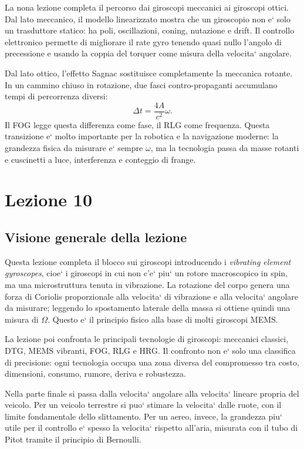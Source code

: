 \documentclass[11pt,a4paper]{article}
\begin{document}
La nona lezione completa il percorso dai giroscopi meccanici ai giroscopi ottici. Dal lato meccanico, il modello linearizzato mostra che un giroscopio non e` solo un trasduttore statico: ha poli, oscillazioni, coning, nutazione e drift. Il controllo elettronico permette di migliorare il rate gyro tenendo quasi nullo l'angolo di precessione e usando la coppia del torquer come misura della velocita` angolare.

Dal lato ottico, l'effetto Sagnac sostituisce completamente la meccanica rotante. In un cammino chiuso in rotazione, due fasci contro-propaganti accumulano tempi di percorrenza diversi:
\[
\Delta t=\frac{4A}{c^2}\omega.
\]
Il FOG legge questa differenza come fase, il RLG come frequenza. Questa transizione e` molto importante per la robotica e la navigazione moderne: la grandezza fisica da misurare e` sempre \(\omega\), ma la tecnologia passa da masse rotanti e cuscinetti a luce, interferenza e conteggio di frange.


\clearpage
\section{Lezione 10}

\subsection{Visione generale della lezione}

Questa lezione completa il blocco sui giroscopi introducendo i \emph{vibrating element gyroscopes}, cioe` i giroscopi in cui non c'e` piu` un rotore macroscopico in spin, ma una microstruttura tenuta in vibrazione. La rotazione del corpo genera una forza di Coriolis proporzionale alla velocita` di vibrazione e alla velocita` angolare da misurare; leggendo lo spostamento laterale della massa si ottiene quindi una misura di \(\Omega\). Questo e` il principio fisico alla base di molti giroscopi MEMS.

La lezione poi confronta le principali tecnologie di giroscopi: meccanici classici, DTG, MEMS vibranti, FOG, RLG e HRG. Il confronto non e` solo una classifica di precisione: ogni tecnologia occupa una zona diversa del compromesso tra costo, dimensioni, consumo, rumore, deriva e robustezza.

Nella parte finale si passa dalla velocita` angolare alla velocita` lineare propria del veicolo. Per un veicolo terrestre si puo` stimare la velocita` dalle ruote, con il limite fondamentale dello slittamento. Per un aereo, invece, la grandezza piu` utile per il controllo e` spesso la velocita` rispetto all'aria, misurata con il tubo di Pitot tramite il principio di Bernoulli.
\end{document}
